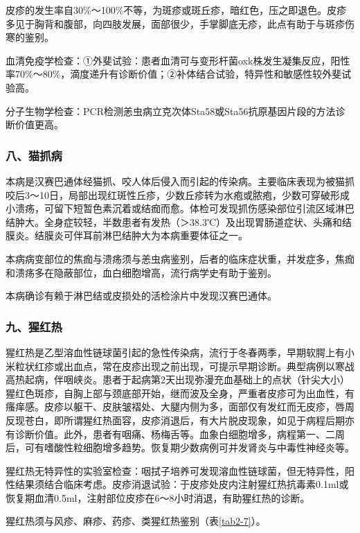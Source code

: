 皮疹的发生率自30\%～100\%不等，为斑疹或斑丘疹，暗红色，压之即退色。皮疹多见于胸背和腹部，向四肢发展，面部很少，手掌脚底无疹，此点有助于与斑疹伤寒的鉴别。

血清免疫学检查：①外斐试验：患者血清可与变形杆菌oxk株发生凝集反应，阳性率70\%～80\%，滴度递升有诊断价值；②补体结合试验，特异性和敏感性较外斐试验高。

分子生物学检查：PCR检测恙虫病立克次体Sta58或Sta56抗原基因片段的方法诊断价值更高。

\subsubsection{八、猫抓病}

本病是汉赛巴通体经猫抓、咬人体后侵入而引起的传染病。主要临床表现为被猫抓咬后3～10日，局部出现红斑性丘疹，少数丘疹转为水疱或脓疱，少数可穿破形成小溃疡，可留下短暂色素沉着或结痂而愈。体检可发现抓伤感染部位引流区域淋巴结肿大。全身症较轻，半数患者有发热（＞38.3℃）及出现胃肠道症状、头痛和结膜炎。结膜炎可伴耳前淋巴结肿大为本病重要体征之一。

本病病变部位的焦痂与溃疡须与恙虫病鉴别，后者的临床症状重，并发症多，焦痂和溃疡多在隐蔽部位，血白细胞增高，流行病学史有助于鉴别。

本病确诊有赖于淋巴结或皮损处的活检涂片中发现汉赛巴通体。

\subsubsection{九、猩红热}

猩红热是乙型溶血性链球菌引起的急性传染病，流行于冬春两季，早期软腭上有小米粒状红疹或出血点，常在皮疹出现之前出现，可提示早期诊断。典型病例以寒战高热起病，伴咽峡炎。患者于起病第2天出现弥漫充血基础上的点状（针尖大小）猩红色斑疹，自胸上部与颈底部开始，继而波及全身，严重者皮疹可为出血性，有瘙痒感。皮疹以躯干、皮肤皱褶处、大腿内侧为多，面部仅有发红而无皮疹，唇周反现苍白，即所谓猩红热面容，皮疹消退后，有大片脱皮现象，如见于病程后期亦有诊断价值。此外，患者有咽痛、杨梅舌等。血象白细胞增多，病程第一、二周后，可有嗜酸性粒细胞增多趋势。恢复期少数病例可并发肾炎与中毒性神经炎等。

猩红热无特异性的实验室检查：咽拭子培养可发现溶血性链球菌，但无特异性，阳性结果须结合临床考虑。皮疹消退试验：于皮疹处皮内注射猩红热抗毒素0.1ml或恢复期血清0.5ml，注射部位皮疹在6～8小时消退，有助猩红热的诊断。

猩红热须与风疹、麻疹、药疹、类猩红热鉴别（表\ref{tab2-7}）。

